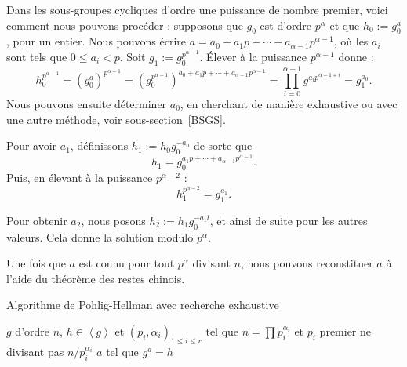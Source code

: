 \documentclass[a4paper, titlepage]{article}
\theoremstyle{definition}
\theoremstyle{remark}
\def\gen #1{\left\langle#1\right\rangle}
\begin{document}
Dans les sous-groupes cycliques d'ordre une puissance de nombre premier, voici comment nous pouvons procéder : supposons que $g_0$ est d'ordre $p^\alpha$ et que $h_0 := g_0^a$, pour un entier. Nous pouvons écrire $a = a_0 + a_1 p + \cdots + a_{\alpha-1}p^{\alpha-1}$, où les $a_i$ sont tels que $0\leqslant a_i < p$. Soit $g_1 := g_0^{p^{\alpha-1}}$. \'Elever à la puissance $p^{\alpha-1}$ donne :
$$h_0^{p^{\alpha-1}} = {(g_0^a)}^{p^{\alpha-1}} = {\left(g_0^{p^{\alpha-1}}\right)}^{a_0 + a_1 p + \cdots + a_{\alpha-1}p^{\alpha-1}} = \prod_{i=0}^{\alpha -1 } g^{a_ip^{\alpha-1+i}} = g_1^{a_0}.$$
Nous pouvons ensuite déterminer $a_0$, en cherchant de manière exhaustive ou avec une autre méthode, voir sous-section~\ref{BSGS}.

Pour avoir $a_1$, définissons $h_1 := h_0g_0^{-a_0}$ de sorte que
$$h_1 = g_0^{a_1 p + \cdots + a_{\alpha-1}p^{\alpha-1}}.$$
Puis, en élevant à la puissance $p^{\alpha-2}$ :
$$h_1^{p^{\alpha-2}} = g_1^{a_1}.$$

Pour obtenir $a_2$, nous posons $h_2 := h_1g_0^{-a_1l}$, et ainsi de suite pour les autres valeurs. Cela donne la solution modulo $p^\alpha$.

Une fois que $a$ est connu pour tout $p^\alpha$ divisant $n$, nous pouvons reconstituer $a$ à l'aide du théorème des restes chinois.

\begin{algorithm}[H]
\caption{Algorithme de Pohlig-Hellman avec recherche exhaustive}
\label{algoPohligHellman}
\begin{algorithmic}[1]
\REQUIRE $g$ d'ordre $n$, $h \in \gen{g}$ et ${(p_i,\alpha_i)}_{1\leqslant i \leqslant r}$ tel que $n = \prod p_i^{\alpha_i}$ et $p_i$ premier ne divisant pas $n/p_i^{\alpha_i}$
\ENSURE $a$ tel que $g^a = h$
			\ENDWHILE
		\ENDIF
	\ENDFOR
\ENDFOR
{}
\end{algorithmic}
\end{algorithm}
\end{document}
